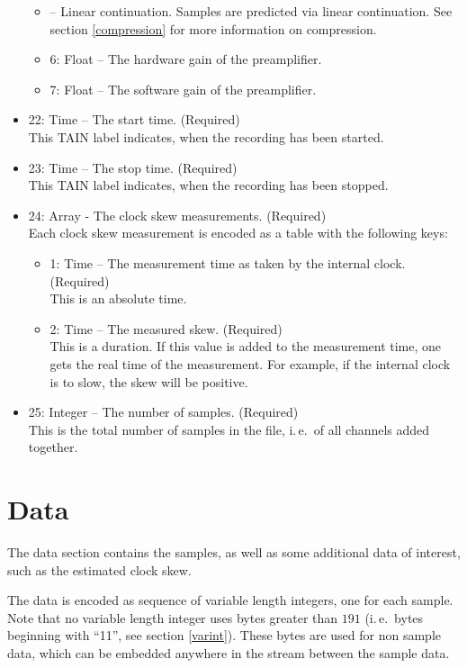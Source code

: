 \documentclass[DIV=10]{scrartcl}
\renewenvironment{quote}
{\list{}{
  \setlength{\rightmargin}{0cm}
  \setlength{\leftmargin}{0.75cm}}%
\item\relax\ignorespaces}
{\unskip\unskip\endlist}
\begin{document}
\begin{itemize}
\begin{itemize}
\begin{quote}
      2 – Linear continuation.
      Samples are predicted via linear continuation.
    \end{quote}
    See section \ref{compression} for more information on compression.
    \item 6: Float – The hardware gain of the preamplifier.
    \item 7: Float – The software gain of the preamplifier.
  \end{itemize}
  \item 22: Time – The start time. (Required)\\
  This TAIN label indicates, when the recording has been started.
  \item 23: Time – The stop time. (Required)\\
  This TAIN label indicates, when the recording has been stopped.
  \item 24: Array - The clock skew measurements. (Required)\\
  Each clock skew measurement is encoded as a table with the following keys:
  \begin{itemize}
    \item 1: Time – The measurement time as taken by the internal clock. (Required)\\
    This is an absolute time.
    \item 2: Time – The measured skew. (Required)\\
    This is a duration.
    If this value is added to the measurement time, one gets the real time of the measurement.
    For example, if the internal clock is to slow, the skew will be positive.
  \end{itemize}
  \item 25: Integer – The number of samples. (Required)\\
  This is the total number of samples in the file, i.\,e.\ of all channels added together.
\end{itemize}

\section{Data}

The data section contains the samples, as well as some additional data of interest, such as the estimated clock skew.

The data is encoded as sequence of variable length integers, one for each sample.
Note that no variable length integer uses bytes greater than \(191\) (i.\,e.\ bytes beginning with “11”, see section \ref{varint}).
These bytes are used for non sample data, which can be embedded anywhere in the stream between the sample data.
\end{document}
